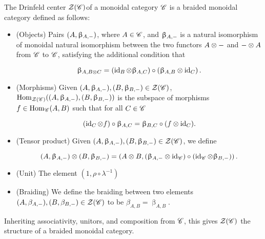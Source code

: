 \begin{proposition} The Drinfeld center $\mathcal{Z}(\mathscr{C})$of a monoidal category $\mathscr{C}$ is a braided monoidal category defined as follows:

\begin{itemize}
\item (Objects) Pairs $(A,\upbeta_{A,\--})$, where $A\in \mathscr{C}$, and $\upbeta_{A,\--}$ is a natural isomorphism of monoidal natural isomorphism between the two functors $A\otimes \--$ and $\--\otimes A$ from $\mathscr{C}$ to $\mathscr{C}$, satisfying the additional condition that

$$\upbeta_{A,B\otimes C}=\left(\operatorname{id}_{B}\otimes \upbeta_{A,C}\right)\circ \left(\upbeta_{A,B}\otimes \operatorname{id}_C\right).$$

\item (Morphisms) Given $(A,\upbeta_{A,\--}), (B,\upbeta_{B,\--})\in \mathcal{Z}(\mathscr{C})$, $\operatorname{Hom}_{\mathcal{Z}(\mathscr{C})}((A,\upbeta_{A,\--}),(B,\upbeta_{B,\--}))$ is the subspace of morphisms $f\in \operatorname{Hom}_{\mathscr{C}}(A,B)$ such that for all $C\in \mathscr{C}$

$$\left(\operatorname{id}_{C}\otimes f\right)\circ \upbeta_{A,C}=\upbeta_{B,C}\circ (f\otimes \operatorname{id}_C).$$

\item (Tensor product) Given $(A,\upbeta_{A,\--}), (B,\upbeta_{B,\--})\in \mathcal{Z}(\mathscr{C})$, we define

$$(A,\upbeta_{A,\--})\otimes (B,\upbeta_{B,\--})=\left(A\otimes B, (\upbeta_{A,\--}\otimes \operatorname{id}_{\mathscr{C}})\circ (\operatorname{id}_{\mathscr{C}}\otimes \upbeta_{B,\--}) \right).$$

\item (Unit) The element $(1,\rho\circ \lambda^{-1})$

\item (Braiding) We define the braiding between two elements $(A,\beta_{A,\--}), (B,\beta_{B,\--})\in \mathcal{Z}(\mathscr{C})$ to be $\beta_{A,B}=\upbeta_{A,B}$.
\end{itemize}

Inheriting associativity, unitors, and composition from $\mathscr{C}$, this gives $\mathcal{Z}(\mathscr{C})$ the structure of a braided monoidal category.
\end{proposition}
